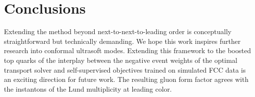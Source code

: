 \section{Conclusions}\label{sec:conclusions}

Extending the method beyond next-to-next-to-leading order is
conceptually straightforward but technically demanding. We hope this
work inspires further research into conformal ultrasoft modes. Extending
this framework to the boosted top quarks of the interplay between the
negative event weights of the optimal transport solver and
self-supervised objectives trained on simulated FCC data is an exciting
direction for future work. The resulting gluon form factor agrees with
the instantons of the Lund multiplicity at leading color.

